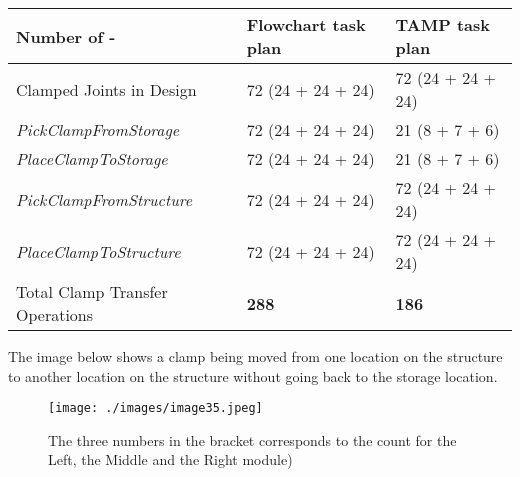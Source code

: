 \begin{table}[H]
\begin{adjustbox}{max width=\textwidth}
\begin{tabular}{p{5.29cm}p{5.25cm}p{5.33cm}}
\hline
\multicolumn{1}{|p{5.29cm}}{{\footnotesize \textbf{Number of - }}} & 
\multicolumn{1}{|p{5.25cm}}{{\footnotesize \textbf{Flowchart task plan}}} & 
\multicolumn{1}{|p{5.33cm}|}{{\footnotesize \textbf{TAMP task plan }}} \\ 
\hline
\multicolumn{1}{|p{5.29cm}}{{\footnotesize Clamped Joints in Design}} & 
\multicolumn{1}{|p{5.25cm}}{{\footnotesize 72 (24 + 24 + 24)}} & 
\multicolumn{1}{|p{5.33cm}|}{{\footnotesize 72 (24 + 24 + 24)}} \\ 
\hline
\multicolumn{1}{|p{5.29cm}}{{\footnotesize \textit{PickClampFromStorage}}} & 
\multicolumn{1}{|p{5.25cm}}{{\footnotesize 72 (24 + 24 + 24)}} & 
\multicolumn{1}{|p{5.33cm}|}{{\footnotesize 21 (8 + 7 + 6)}} \\ 
\hline
\multicolumn{1}{|p{5.29cm}}{{\footnotesize \textit{PlaceClampToStorage}}} & 
\multicolumn{1}{|p{5.25cm}}{{\footnotesize 72 (24 + 24 + 24)}} & 
\multicolumn{1}{|p{5.33cm}|}{{\footnotesize 21 (8 + 7  + 6)}} \\ 
\hline
\multicolumn{1}{|p{5.29cm}}{{\footnotesize \textit{PickClampFromStructure}}} & 
\multicolumn{1}{|p{5.25cm}}{{\footnotesize 72 (24 + 24 + 24)}} & 
\multicolumn{1}{|p{5.33cm}|}{{\footnotesize 72 (24 + 24 + 24)}} \\ 
\hline
\multicolumn{1}{|p{5.29cm}}{{\footnotesize \textit{PlaceClampToStructure}}} & 
\multicolumn{1}{|p{5.25cm}}{{\footnotesize 72 (24 + 24 + 24)}} & 
\multicolumn{1}{|p{5.33cm}|}{{\footnotesize 72 (24 + 24 + 24)}} \\ 
\hline
\multicolumn{1}{|p{5.29cm}}{{\footnotesize Total Clamp Transfer Operations}} & 
\multicolumn{1}{|p{5.25cm}}{{\footnotesize \textbf{288}}} & 
\multicolumn{1}{|p{5.33cm}|}{{\footnotesize \textbf{186}}} \\ 
\hline
\end{tabular}
\end{adjustbox}
\end{table}
The image below shows a clamp being moved from one location on the structure to another location on the structure without going back to the storage location.

\begin{figure}[H]
\texttt{[image: ./images/image35.jpeg]}
\caption{The three numbers in the bracket corresponds to the count for the Left, the Middle and the Right module)}
\label{fig:three_numbers_bracket_corresponds_count}
\end{figure}


